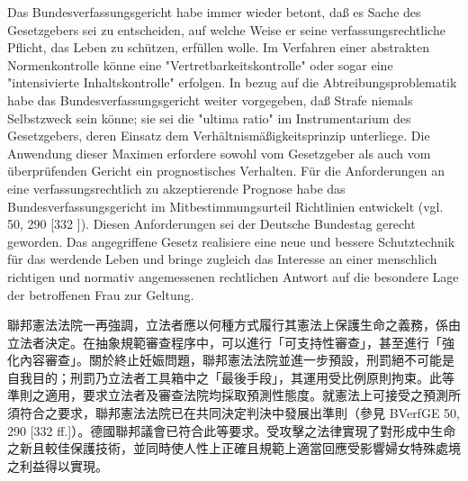 \documentclass[12pt]{article}
\begin{document}
\begin{sourcepara}[title={原文C.17}]
Das Bundesverfassungsgericht habe immer wieder betont, daß es Sache des Gesetzgebers sei zu entscheiden, auf welche Weise er seine verfassungsrechtliche Pflicht, das Leben zu schützen, erfüllen wolle. Im Verfahren einer abstrakten Normenkontrolle könne eine "Vertretbarkeitskontrolle" oder sogar eine "intensivierte Inhaltskontrolle" erfolgen. In bezug auf die Abtreibungsproblematik habe das Bundesverfassungsgericht weiter vorgegeben, daß Strafe niemals Selbstzweck sein könne; sie sei die "ultima ratio" im Instrumentarium des Gesetzgebers, deren Einsatz dem Verhältnismäßigkeitsprinzip unterliege. Die Anwendung dieser Maximen erfordere sowohl vom Gesetzgeber als auch vom überprüfenden Gericht ein prognostisches Verhalten. Für die Anforderungen an eine verfassungsrechtlich zu akzeptierende Prognose habe das Bundesverfassungsgericht im Mitbestimmungsurteil Richtlinien entwickelt (vgl. \abbrBVerfGE{} 50, 290 [332 \abbrFF{}]). Diesen Anforderungen sei der Deutsche Bundestag gerecht geworden. Das angegriffene Gesetz realisiere eine neue und bessere Schutztechnik für das werdende Leben und bringe zugleich das Interesse an einer menschlich richtigen und normativ angemessenen rechtlichen Antwort auf die besondere Lage der betroffenen Frau zur Geltung.
\end{sourcepara}
\begin{transpara}
聯邦憲法法院一再強調，立法者應以何種方式履行其憲法上保護生命之義務，係由立法者決定。在抽象規範審查程序中，可以進行「可支持性審查」，甚至進行「強化內容審查」。關於終止妊娠問題，聯邦憲法法院並進一步預設，刑罰絕不可能是自我目的；刑罰乃立法者工具箱中之「最後手段」，其運用受比例原則拘束。此等準則之適用，要求立法者及審查法院均採取預測性態度。就憲法上可接受之預測所須符合之要求，聯邦憲法法院已在共同決定判決中發展出準則（參見 BVerfGE 50, 290 [332 ff.]）。德國聯邦議會已符合此等要求。受攻擊之法律實現了對形成中生命之新且較佳保護技術，並同時使人性上正確且規範上適當回應受影響婦女特殊處境之利益得以實現。
\end{transpara}
\end{document}
